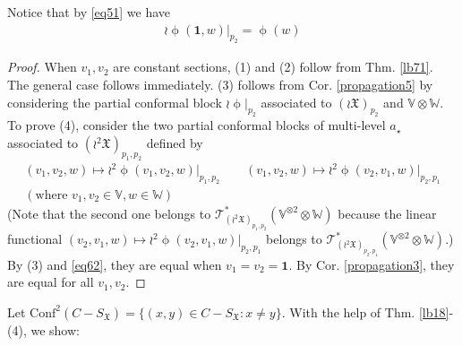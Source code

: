 \documentclass[11pt,b5paper,notitlepage]{article}
\theoremstyle{definition}
\theoremstyle{plain}
\newcommand{\fk}{\mathfrak}
\newcommand{\idt}{\mathbf{1}}
\newcommand{\Conf}{\mathrm{Conf}}
\newcommand{\scr}{\mathscr}
\newcommand{\SX}{{S_{\fk X}}}
\newcommand{\Vbb}{\mathbb V}
\newcommand{\Wbb}{\mathbb W}
\newcommand{\<}{\left\langle}
\renewcommand{\>}{\right\rangle}
\newcommand{\fx}{\mathfrak{X}}
\numberwithin{equation}{section}
\begin{document}
Notice that by \eqref{eq51} we have
\begin{align}
\wr\upphi(\idt,w)|_{p_2}=\upphi(w)  \label{eq62}
\end{align}

\begin{proof}
When $v_1,v_2$ are constant sections, (1) and (2) follow from Thm. \ref{lb71}. The general case follows immediately. (3) follows from Cor. \ref{propagation5} by considering the partial conformal block $\wr\upphi\vert_{p_2}$ associated to $(\wr\fx)_{p_2}$ and $\Vbb\otimes \Wbb$. To prove (4), consider the two partial conformal blocks of multi-level $a_\star$ associated to $(\wr^2\fx)_{p_1,p_2}$ defined by
\begin{gather*}
(v_1,v_2,w)\mapsto \wr^2\upphi(v_1,v_2,w)\vert_{p_1,p_2}\qquad (v_1,v_2,w)\mapsto \wr^2\upphi(v_2,v_1,w)\vert_{p_2,p_1}\\
(\text{where }v_1,v_2\in\Vbb,w\in\Wbb)
\end{gather*}
(Note that the second one belongs to $\scr T_{(\wr^2\fk X)_{p_1,p_2}}^*(\Vbb^{\otimes 2}\otimes\Wbb)$ because the linear functional $(v_2,v_1,w)\mapsto \wr^2\upphi(v_2,v_1,w)\vert_{p_2,p_1}$ belongs to $\scr T_{(\wr^2\fx)_{p_2,p_1}}^*(\Vbb^{\otimes 2}\otimes\Wbb)$.) By (3) and \eqref{eq62}, they are equal when $v_1=v_2=\idt$. By Cor. \ref{propagation3}, they are equal for all $v_1,v_2$.
\end{proof}


Let $\displaystyle \Conf^2(C-\SX)=\{(x,y)\in C-\SX:x\neq y\}$. With the help of Thm. \ref{lb18}-(4), we show:
\end{document}
